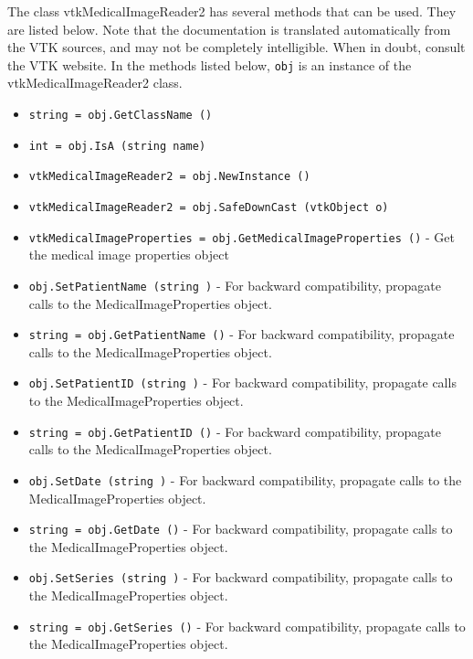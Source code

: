 The class vtkMedicalImageReader2 has several methods that can be used.
  They are listed below.
Note that the documentation is translated automatically from the VTK sources,
and may not be completely intelligible.  When in doubt, consult the VTK website.
In the methods listed below, \verb|obj| is an instance of the vtkMedicalImageReader2 class.
\begin{itemize}
\item  \verb|string = obj.GetClassName ()|

\item  \verb|int = obj.IsA (string name)|

\item  \verb|vtkMedicalImageReader2 = obj.NewInstance ()|

\item  \verb|vtkMedicalImageReader2 = obj.SafeDownCast (vtkObject o)|

\item  \verb|vtkMedicalImageProperties = obj.GetMedicalImageProperties ()| -  Get the medical image properties object

\item  \verb|obj.SetPatientName (string )| -  For backward compatibility, propagate calls to the MedicalImageProperties
 object.

\item  \verb|string = obj.GetPatientName ()| -  For backward compatibility, propagate calls to the MedicalImageProperties
 object.

\item  \verb|obj.SetPatientID (string )| -  For backward compatibility, propagate calls to the MedicalImageProperties
 object.

\item  \verb|string = obj.GetPatientID ()| -  For backward compatibility, propagate calls to the MedicalImageProperties
 object.

\item  \verb|obj.SetDate (string )| -  For backward compatibility, propagate calls to the MedicalImageProperties
 object.

\item  \verb|string = obj.GetDate ()| -  For backward compatibility, propagate calls to the MedicalImageProperties
 object.

\item  \verb|obj.SetSeries (string )| -  For backward compatibility, propagate calls to the MedicalImageProperties
 object.

\item  \verb|string = obj.GetSeries ()| -  For backward compatibility, propagate calls to the MedicalImageProperties
 object.


\end{itemize}
